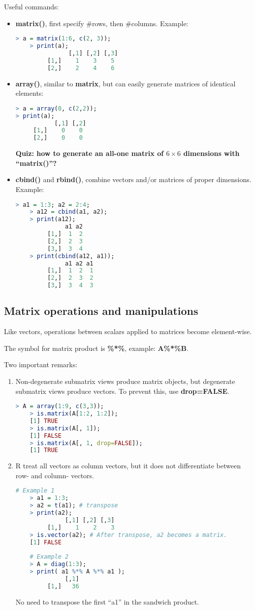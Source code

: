 \documentclass[10pt]{article}
\begin{document}
Useful commands:
\begin{itemize}
	\item {\bf matrix()}, first specify \#rows, then \#columns. Example:
\begin{lstlisting}[style=displaycode, language=R]
	> a = matrix(1:6, c(2, 3));
	> print(a);
	           [,1] [,2] [,3]
	     [1,]    1    3    5
	     [2,]    2    4    6
\end{lstlisting}
	\item {\bf array()}, similar to {\bf matrix}, but can easily generate matrices of identical elements:
\begin{lstlisting}[style=displaycode, language=R]
> a = array(0, c(2,2));
> print(a);
           [,1] [,2]
     [1,]    0    0
     [2,]    0    0
\end{lstlisting}
	{\bf Quiz: how to generate an all-one matrix of $6\times 6$ dimensions with ``matrix()''?}
	\item {\bf cbind()} and {\bf rbind()}, combine vectors and/or matrices of proper dimensions. Example:
\begin{lstlisting}[style=displaycode, language=R]
	> a1 = 1:3; a2 = 2:4;
	> a12 = cbind(a1, a2);
	> print(a12);
	          a1 a2
	     [1,]  1  2
	     [2,]  2  3
	     [3,]  3  4
	> print(cbind(a12, a1));
	          a1 a2 a1
	     [1,]  1  2  1
	     [2,]  2  3  2
	     [3,]  3  4  3
\end{lstlisting}
\end{itemize}

\subsection{Matrix operations and manipulations}
Like vectors, operations between scalars applied to matrices become element-wise.

The symbol for matrix product is {\bf \%*\%}, example: {\bf A\%*\%B}.

Two important remarks:
\begin{enumerate}
	\item Non-degenerate submatrix views produce matrix objects, but degenerate submatrix views produce vectors. To prevent this, use {\bf drop=FALSE}.
\begin{lstlisting}[style=displaycode, language=R]
	> A = array(1:9, c(3,3));
	> is.matrix(A[1:2, 1:2]);
	[1] TRUE
	> is.matrix(A[, 1]);
	[1] FALSE
	> is.matrix(A[, 1, drop=FALSE]);
	[1] TRUE
\end{lstlisting}
	\item R treat all vectors as column vectors, but it does not differentiate between row- and column- vectors.
\begin{lstlisting}[style=displaycode, language=R]
	# Example 1
	> a1 = 1:3;
	> a2 = t(a1); # transpose
	> print(a2);
	          [,1] [,2] [,3]
	     [1,]    1    2    3
	> is.vector(a2); # After transpose, a2 becomes a matrix.
	[1] FALSE
	
	# Example 2
	> A = diag(1:3);
	> print( a1 %*% A %*% a1 );
	          [,1]
	     [1,]   36
\end{lstlisting}
	No need to transpose the first ``a1'' in the sandwich product.
\end{enumerate}
\end{document}
